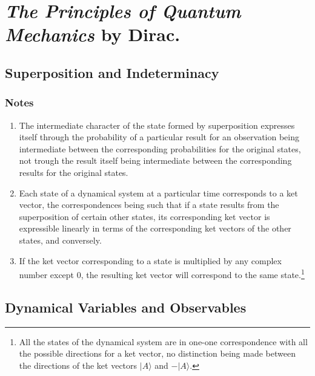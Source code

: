 \chapter{\emph{The Principles of Quantum Mechanics} by Dirac.}

\section{Superposition and Indeterminacy}
\subsection{Notes}
\begin{enumerate}
\item The intermediate character of the state formed by superposition expresses itself through the probability of a particular result for an observation being intermediate between the corresponding probabilities for the original states, not trough the result itself being intermediate between the corresponding results for the original states.

\item Each state of a dynamical system at a particular time corresponds to a ket vector, the correspondences being such that if a state results from the superposition of certain other states, its corresponding ket vector is expressible linearly in terms of the corresponding ket vectors of the other states, and conversely.

\item If the ket vector corresponding to a state is multiplied by any complex number except $0$, the resulting ket vector will correspond to the same state.\footnote{All the states of the dynamical system are in one-one correspondence with all the possible directions for a ket vector, no distinction being made between the directions of the ket vectors $|A \rangle$ and $-|A \rangle$.}

\end{enumerate}




\section{Dynamical Variables and Observables}
